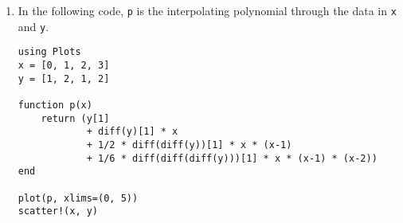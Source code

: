 \documentclass{article}
\newcommand{\julia}[1]{\texttt{#1}}
\begin{document}
\begin{enumerate}
    \item
        In the following code,
        \julia{p} is the interpolating polynomial through the data in \julia{x} and \julia{y}.
        \begin{verbatim}
using Plots
x = [0, 1, 2, 3]
y = [1, 2, 1, 2]

function p(x)
    return (y[1]
            + diff(y)[1] * x
            + 1/2 * diff(diff(y))[1] * x * (x-1)
            + 1/6 * diff(diff(diff(y)))[1] * x * (x-1) * (x-2))
end

plot(p, xlims=(0, 5))
scatter!(x, y)
        \end{verbatim}
\end{enumerate}
\end{document}
